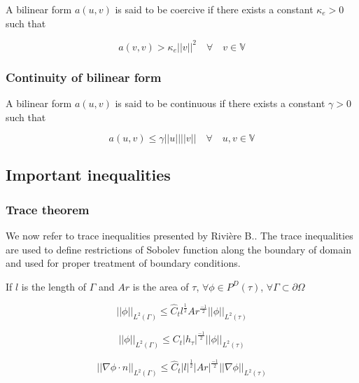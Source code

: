 \documentclass[a4paper]{book}
\begin{document}
\begin{appendices}
A bilinear form $a(u,v)$ is said to be coercive if there exists a constant $\kappa_e > 0$ such that

\begin{equation}\label{Coercivity}
a(v,v) > \kappa_e ||v||^2   \quad \forall \quad v \in  \mathbb{V}
\end{equation}

\subsubsection{Continuity of bilinear form}

A bilinear form $a(u,v)$ is said to be continuous if there exists a constant $\gamma > 0$ such that

\begin{equation}\label{Continuity_constant}
a(u,v) \leq \gamma ||u||||v|| \quad  \forall \quad u,v \in  \mathbb{V}
\end{equation}

\subsection{Important inequalities}

\subsubsection{Trace theorem} 

We now refer to trace inequalities presented by Rivi\`ere B.\cite{riviere}. The trace inequalities are used to define restrictions of Sobolev function along the boundary of domain and used for proper treatment of boundary conditions. 

If $l$ is the length of $\Gamma$ and $Ar$ is the area of $\tau$,  $\forall \phi \in P^D (\tau)$, $\forall \Gamma \subset \partial \Omega$

\begin{equation}
||\phi||_{L^2(\Gamma)} \leq \hat{C}_t l^{\frac{1}{2}} Ar^{\frac{-1}{2}} ||\phi||_{L^2(\tau)}
\end{equation}

\begin{equation}
||\phi||_{L^2(\Gamma)} \leq {C}_t |h_\tau|^{\frac{-1}{2}} ||\phi||_{L^2(\tau)}
\end{equation}

\begin{equation}
||\nabla \phi \cdot n||_{L^2(\Gamma)} \leq \hat{C}_t |l|^{\frac{1}{2}} |Ar|^{\frac{-1}{2}} ||\nabla \phi||_{L^2(\tau)}
\end{equation}


\end{appendices}
\end{document}
